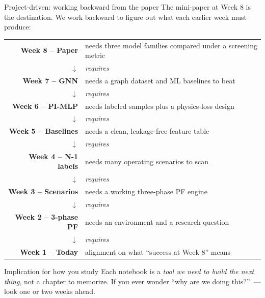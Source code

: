 \documentclass[aspectratio=169,10pt]{beamer}
\begin{document}
\begin{frame}[shrink=7]{Project-driven: working backward from the paper}
The mini-paper at Week 8 is the destination. We work backward to figure out what each earlier week must produce:
\vspace{0.4em}
\centering
\small
\begin{tabular}{rl}
\textbf{Week 8 -- Paper} & needs three model families compared under a screening metric \\
$\downarrow$ & \emph{requires} \\
\textbf{Week 7 -- GNN} & needs a graph dataset and ML baselines to beat \\
$\downarrow$ & \emph{requires} \\
\textbf{Week 6 -- PI-MLP} & needs labeled samples plus a physics-loss design \\
$\downarrow$ & \emph{requires} \\
\textbf{Week 5 -- Baselines} & needs a clean, leakage-free feature table \\
$\downarrow$ & \emph{requires} \\
\textbf{Week 4 -- N-1 labels} & needs many operating scenarios to scan \\
$\downarrow$ & \emph{requires} \\
\textbf{Week 3 -- Scenarios} & needs a working three-phase PF engine \\
$\downarrow$ & \emph{requires} \\
\textbf{Week 2 -- 3-phase PF} & needs an environment and a research question \\
$\downarrow$ & \emph{requires} \\
\textbf{Week 1 -- Today} & alignment on what ``success at Week 8'' means \\
\end{tabular}
\vspace{0.5em}
\normalsize
\begin{block}{Implication for how you study}
Each notebook is a \emph{tool we need to build the next thing}, not a chapter to memorize. If you ever wonder ``why are we doing this?''~--- look one or two weeks ahead.
\end{block}
\end{frame}
\end{document}
